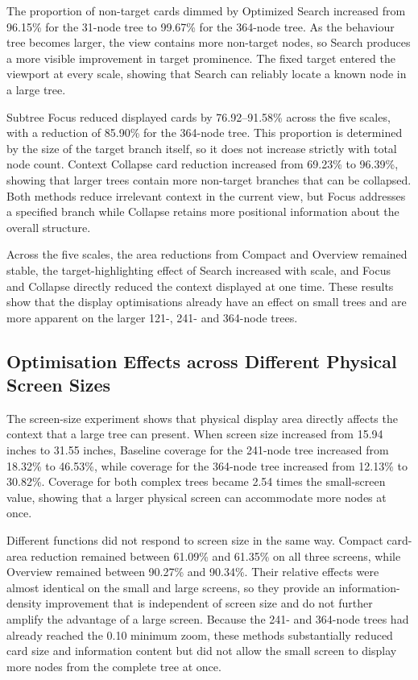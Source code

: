 The proportion of non-target cards dimmed by Optimized Search increased from 96.15\% for the 31-node tree to 99.67\% for the 364-node tree. As the behaviour tree becomes larger, the view contains more non-target nodes, so Search produces a more visible improvement in target prominence. The fixed target entered the viewport at every scale, showing that Search can reliably locate a known node in a large tree.

Subtree Focus reduced displayed cards by 76.92--91.58\% across the five scales, with a reduction of 85.90\% for the 364-node tree. This proportion is determined by the size of the target branch itself, so it does not increase strictly with total node count. Context Collapse card reduction increased from 69.23\% to 96.39\%, showing that larger trees contain more non-target branches that can be collapsed. Both methods reduce irrelevant context in the current view, but Focus addresses a specified branch while Collapse retains more positional information about the overall structure.

Across the five scales, the area reductions from Compact and Overview remained stable, the target-highlighting effect of Search increased with scale, and Focus and Collapse directly reduced the context displayed at one time. These results show that the display optimisations already have an effect on small trees and are more apparent on the larger 121-, 241- and 364-node trees.

\subsection{Optimisation Effects across Different Physical Screen Sizes}

The screen-size experiment shows that physical display area directly affects the context that a large tree can present. When screen size increased from 15.94 inches to 31.55 inches, Baseline coverage for the 241-node tree increased from 18.32\% to 46.53\%, while coverage for the 364-node tree increased from 12.13\% to 30.82\%. Coverage for both complex trees became 2.54 times the small-screen value, showing that a larger physical screen can accommodate more nodes at once.

Different functions did not respond to screen size in the same way. Compact card-area reduction remained between 61.09\% and 61.35\% on all three screens, while Overview remained between 90.27\% and 90.34\%. Their relative effects were almost identical on the small and large screens, so they provide an information-density improvement that is independent of screen size and do not further amplify the advantage of a large screen. Because the 241- and 364-node trees had already reached the 0.10 minimum zoom, these methods substantially reduced card size and information content but did not allow the small screen to display more nodes from the complete tree at once.

